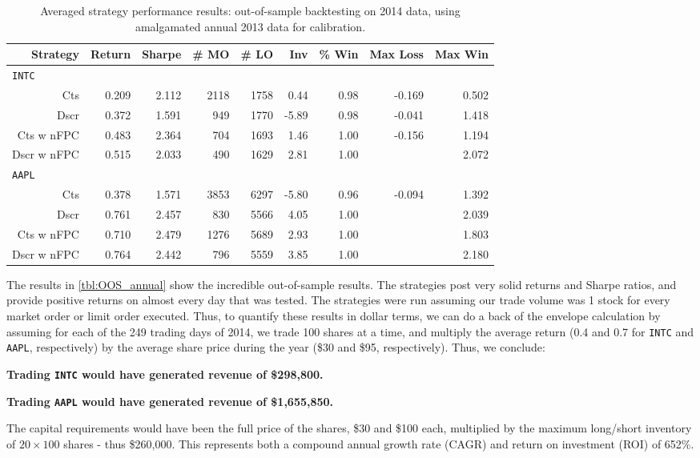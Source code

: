 \begin{table}
\centering
{}
\begin{tabular}{@{} *{9}{r} @{}}
\toprule
Strategy & Return & Sharpe & \# MO & \# LO & Inv & \% Win & Max Loss & Max Win \\
\midrule
\multicolumn{9}{l}{\texttt{INTC}} \\ 
Cts & 0.209 & 2.112 & 2118 & 1758 & 0.44 & 0.98 & -0.169 & 0.502 \\ 
Dscr & 0.372 & 1.591 & 949 & 1770 & -5.89 & 0.98 & -0.041 & 1.418 \\ 
Cts w nFPC & 0.483 & 2.364 & 704 & 1693 & 1.46 & 1.00 & -0.156 & 1.194 \\ 
Dscr w nFPC & 0.515 & 2.033 & 490 & 1629 & 2.81 & 1.00 &  & 2.072 \\  [2ex]
\multicolumn{9}{l}{\texttt{AAPL}} \\ 
Cts & 0.378 & 1.571 & 3853 & 6297 & -5.80 & 0.96 & -0.094 & 1.392 \\ 
Dscr & 0.761 & 2.457 & 830 & 5566 & 4.05 & 1.00 &  & 2.039 \\ 
Cts w nFPC & 0.710 & 2.479 & 1276 & 5689 & 2.93 & 1.00 &  & 1.803 \\ 
Dscr w nFPC & 0.764 & 2.442 & 796 & 5559 & 3.85 & 1.00 &  & 2.180 \\
\bottomrule
\end{tabular}
\caption{Averaged strategy performance results: out-of-sample backtesting on 2014 data, using amalgamated annual 2013 data for calibration.}
\label{tbl:OOS_annual}
\end{table}

The results in \autoref{tbl:OOS_annual} show the incredible out-of-sample results. The strategies post very solid returns and Sharpe ratios, and provide positive returns on almost every day that was tested. The strategies were run assuming our trade volume was 1 stock for every market order or limit order executed. Thus, to quantify these results in dollar terms, we can do a back of the envelope calculation by assuming for each of the 249 trading days of 2014, we trade 100 shares at a time, and multiply the average return (0.4 and 0.7 for \texttt{INTC} and \texttt{AAPL}, respectively) by the average share price during the year (\$30 and \$95, respectively). Thus, we conclude:

\begin{center}
{\bf Trading \texttt{INTC} would have generated revenue of \$298,800.} \par
{\bf Trading \texttt{AAPL} would have generated revenue of \$1,655,850.}
\end{center}

The capital requirements would have been the full price of the shares, \$30 and \$100 each, multiplied by the maximum long/short inventory of $20 \times 100$ shares - thus \$260,000. This represents both a compound annual growth rate (CAGR) and return on investment (ROI) of 652\%.